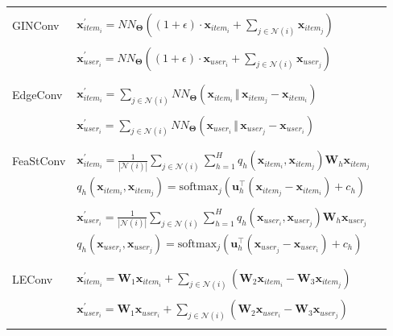\documentclass[bst/sn-nature]{sn-jnl}
\begin{document}
\begin{appendices}
\begin{longtable}{|l|l|l|}
     & \\
    GINConv & $\mathbf{x}^{\prime}_{item_{i}} = NN_{\mathbf{\Theta}} \left( (1 + \epsilon) \cdot \mathbf{x}_{item_{i}} + \sum_{j \in \mathcal{N}(i)} \mathbf{x}_{item_{j}} \right)$ \\
     & \\
    & $\mathbf{x}^{\prime}_{user_{i}} = NN_{\mathbf{\Theta}} \left( (1 + \epsilon) \cdot \mathbf{x}_{user_{i}} + \sum_{j \in \mathcal{N}(i)} \mathbf{x}_{user_{j}} \right)$ \\
     & \\
     
    \rowcolor[gray]{0.9} & \\
    \rowcolor[gray]{0.9} EdgeConv & $\mathbf{x}^{\prime}_{item_{i}} = \sum_{j \in \mathcal{N}(i)} NN_{\mathbf{\Theta}}(\mathbf{x}_{item_{i}} \, \Vert \, \mathbf{x}_{item_{j}} - \mathbf{x}_{item_{i}})$ \\
    \rowcolor[gray]{0.9} & \\
    \rowcolor[gray]{0.9} & $\mathbf{x}^{\prime}_{user_{i}} = \sum_{j \in \mathcal{N}(i)} NN_{\mathbf{\Theta}}(\mathbf{x}_{user_{i}} \, \Vert \, \mathbf{x}_{user_{j}} - \mathbf{x}_{user_{i}})$ \\
    \rowcolor[gray]{0.9} & \\

     & \\
    FeaStConv & $\mathbf{x}^{\prime}_{item_{i}} = \frac{1}{|\mathcal{N}(i)|} \sum_{j \in \mathcal{N}(i)} \sum_{h=1}^H
    q_h(\mathbf{x}_{item_{i}}, \mathbf{x}_{item_{j}}) \mathbf{W}_h \mathbf{x}_{item_{j}}$ \\
    & $q_h(\mathbf{x}_{item_{i}}, \mathbf{x}_{item_{j}}) = \mathrm{softmax}_{j}
    (\mathbf{u}_h^{\top} (\mathbf{x}_{item_{j}} - \mathbf{x}_{item_{i}}) + c_h)$ \\
     & \\
    &  $\mathbf{x}^{\prime}_{user_{i}} = \frac{1}{|\mathcal{N}(i)|} \sum_{j \in \mathcal{N}(i)} \sum_{h=1}^H
    q_h(\mathbf{x}_{user_{i}}, \mathbf{x}_{user_{j}}) \mathbf{W}_h \mathbf{x}_{user_{j}}$ \\
    & $q_h(\mathbf{x}_{user_{i}}, \mathbf{x}_{user_{j}}) = \mathrm{softmax}_j
    (\mathbf{u}_h^{\top} (\mathbf{x}_{user_{j}} - \mathbf{x}_{user_{i}}) + c_h)$ \\
     & \\

    \rowcolor[gray]{0.9} & \\
    \rowcolor[gray]{0.9} LEConv & $\mathbf{x}^{\prime}_{item_{i}} =  \mathbf{W}_1 \mathbf{x}_{item_{i}}+
    \sum_{j \in \mathcal{N}(i)}
    (\mathbf{W}_2 \mathbf{x}_{item_{i}} - \mathbf{W}_3 \mathbf{x}_{item_{j}})$ \\
    \rowcolor[gray]{0.9} & \\
    \rowcolor[gray]{0.9} & $\mathbf{x}^{\prime}_{user_{i}} = \mathbf{W}_1 \mathbf{x}_{user_{i}}+
    \sum_{j \in \mathcal{N}(i)}
    (\mathbf{W}_2 \mathbf{x}_{user_{i}} - \mathbf{W}_3 \mathbf{x}_{user_{j}})$ \\
    \rowcolor[gray]{0.9} & \\


\end{longtable}
\end{appendices}
\end{document}
